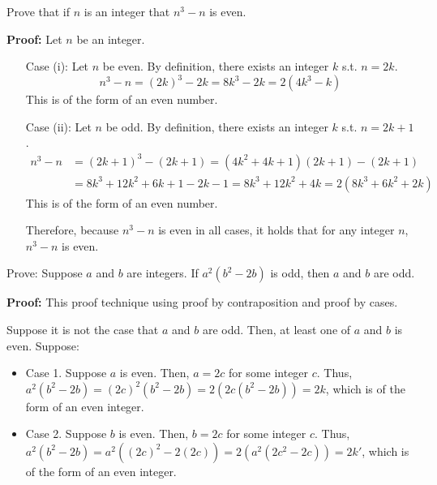 \begin{questions}
 Prove that if $n$ is an integer that $n^3 - n$ is even.
    \ifprintanswers
        \vspace{-10pt}
    \fi
\begin{solution} \textbf{Proof:} Let $n$ be an integer.
    \begin{itemize}[itemsep=0pt,parsep=0pt,topsep=0pt,partopsep=0pt]
        \item[Case] (i): Let $n$ be even. By definition, there exists an integer $k$ s.t. $n=2k$.
            \[ n^3 - n = (2k)^3 - 2k = 8k^3 - 2k = 2(4k^3 - k) \]
        This is of the form of an even number.
        \item[Case] (ii):  Let $n$ be odd.  By definition, there exists an integer $k$ s.t. $n = 2k+1$.
            \begin{align*}
                n^3 - n &= (2k+1)^3 - (2k+1) = (4k^2 + 4k+ 1)(2k + 1) - (2k+1) \\
                &= 8k^3 + 12k^2 + 6k + 1 - 2k - 1 = 8k^3 + 12k^2 + 4k = 2(8k^3 + 6k^2 + 2k)
            \end{align*}
        This is of the form of an even number.

        Therefore, because $n^3 - n$ is even in all cases, it holds that for any integer $n$, $n^3 - n$ is even.
    \end{itemize}
\end{solution}


 Prove: Suppose $a$ and $b$ are integers. If $a^2(b^2 - 2b)$ is odd, then $a$ and $b$ are odd. 
    \ifprintanswers
        \vspace{-10pt}
    \fi
\begin{solution} \textbf{Proof:} This proof technique using proof by contraposition and proof by cases. 

Suppose it is not the case that $a$ and $b$ are odd. Then, at least one of $a$ and $b$ is even.  Suppose: 
\begin{itemize}
  \item Case 1.  Suppose $a$ is even.  Then, $a = 2c$ for some integer $c$.  Thus, $a^2(b^2 -2b) = (2c)^2(b^2 - 2b) = 2(2c(b^2 - 2b)) = 2k$, which is of the form of an even integer. 
  \item Case 2.  Suppose $b$ is even.  Then, $b = 2c$ for some integer $c$.  Thus, $a^2(b^2 -2b) = a^2((2c)^2 - 2(2c)) = 2(a^2(2c^2 - 2c)) = 2k'$, which is of the form of an even integer. 
\end{itemize}


\end{solution}
\end{questions}
